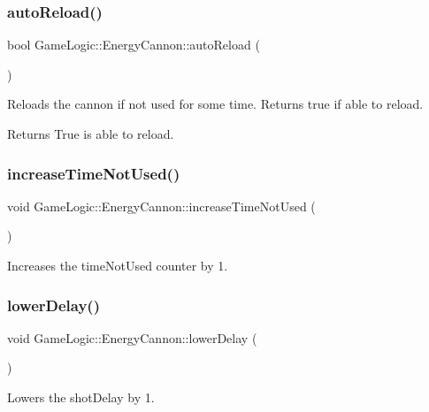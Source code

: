 \subsubsection{\texorpdfstring{auto\+Reload()}{autoReload()}}
{\footnotesize\ttfamily bool Game\+Logic\+::\+Energy\+Cannon\+::auto\+Reload (\begin{DoxyParamCaption}{ }\end{DoxyParamCaption})}

Reloads the cannon if not used for some time. Returns true if able to reload. \begin{DoxyReturn}{Returns}
True is able to reload. 
\end{DoxyReturn}
\mbox{\label{classGameLogic_1_1EnergyCannon_a1499b7d8e1df720b314a263f61e69e7d}} 
\subsubsection{\texorpdfstring{increase\+Time\+Not\+Used()}{increaseTimeNotUsed()}}
{\footnotesize\ttfamily void Game\+Logic\+::\+Energy\+Cannon\+::increase\+Time\+Not\+Used (\begin{DoxyParamCaption}{ }\end{DoxyParamCaption})}

Increases the time\+Not\+Used counter by 1. \mbox{\label{classGameLogic_1_1EnergyCannon_a29274434c4a4f12bbf829eb4f6fa2559}} 
\subsubsection{\texorpdfstring{lower\+Delay()}{lowerDelay()}}
{\footnotesize\ttfamily void Game\+Logic\+::\+Energy\+Cannon\+::lower\+Delay (\begin{DoxyParamCaption}{ }\end{DoxyParamCaption})}

Lowers the shot\+Delay by 1. \mbox{\label{classGameLogic_1_1EnergyCannon_aa83309544f619024d575b88745260d8e}} 
